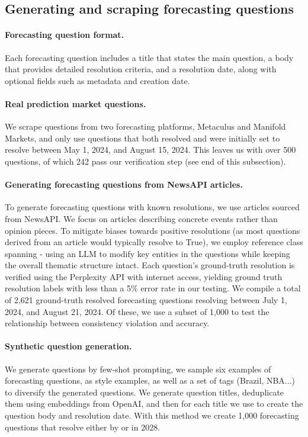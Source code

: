 \subsection{Generating and scraping forecasting questions}
\label{cfc:sec:fq-generation}

\paragraph{Forecasting question format.}
Each forecasting question includes a title that states the main question, a body that provides detailed resolution criteria, and a resolution date, along with optional fields such as metadata and creation date.


\paragraph{Real prediction market questions.}
We scrape questions from two forecasting platforms, Metaculus and Manifold Markets, and only use questions that both resolved and were initially set to resolve between May 1, 2024, and August 15, 2024.
This leaves us with over 500 questions, of which 242 pass our verification step (see end of this subsection).

\paragraph{Generating forecasting questions from NewsAPI articles.}
To generate forecasting questions with known resolutions, we use articles sourced from NewsAPI. We focus on articles describing concrete events rather than opinion pieces. To mitigate biases towards positive resolutions (as most questions derived from an article would typically resolve to True), we employ reference class spanning - using an LLM to modify key entities in the questions while keeping the overall thematic structure intact. Each question's ground-truth resolution is verified using the Perplexity API with internet access, yielding ground truth resolution labels with less than a 5\% error rate in our testing. We compile a total of 2,621 ground-truth resolved forecasting questions resolving between July 1, 2024, and August 21, 2024. Of these, we use a subset of 1,000 to test the relationship between consistency violation and accuracy.

\paragraph{Synthetic question generation.}
We generate questions by few-shot prompting, we sample six examples of forecasting questions, as style examples, as well as a set of tags (Brazil, NBA...) to diversify the generated questions.
We generate question titles, deduplicate them using \textembedsmall{} embeddings from OpenAI, and then for each title we use \gptfouro{} to create the question body and resolution date. With this method we create 1,000 forecasting questions that resolve either by or in 2028.


